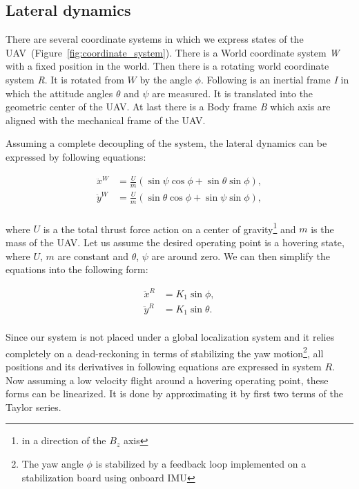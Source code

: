 \subsection{Lateral dynamics}

There are several coordinate systems in which we express states of the UAV~(Figure~\ref{fig:coordinate_system}). There is a World coordinate system \textit{W} with a fixed position in the world. Then there is a rotating world coordinate system \textit{R}. It is rotated from $W$ by the angle $\phi$. Following is an inertial frame \textit{I} in which the attitude angles $\theta$ and $\psi$ are measured. It is translated into the geometric center of the UAV. At last there is a Body frame \textit{B} which axis are aligned with the mechanical frame of the UAV.

Assuming a complete decoupling of the system, the lateral dynamics can be expressed by following equations:

\begin{equation}
\begin{split}
\ddot{x}^W &= \frac{U}{m}\left(\sin\psi\cos\phi + \sin\theta\sin\phi\right),\\
\ddot{y}^W &= \frac{U}{m}\left(\sin\theta\cos\phi + \sin\psi\sin\phi\right),\\
\end{split}
\end{equation}

where $U$ is a the total thrust force action on a center of gravity\footnote{in a direction of the $B_z$ axis} and $m$ is the mass of the UAV. Let us assume the desired operating point is a hovering state, where $U$, $m$ are constant and $\theta$, $\psi$ are around zero. We can then simplify the equations into the following form:

\begin{equation}
\begin{split}
\ddot{x}^R &= K_1\sin \phi,\\
\ddot{y}^R &= K_1\sin \theta.\\
\end{split}
\label{eq:attitude_first_lin}
\end{equation}

Since our system is not placed under a global localization system and it relies completely on a dead-reckoning in terms of stabilizing the yaw motion\footnote{The yaw angle $\phi$ is stabilized by a feedback loop implemented on a stabilization board using onboard IMU}, all positions and its derivatives in following equations are expressed in system $R$. Now assuming a low velocity flight around a hovering operating point, these forms can be linearized. It is done by approximating it by first two terms of the Taylor series.

